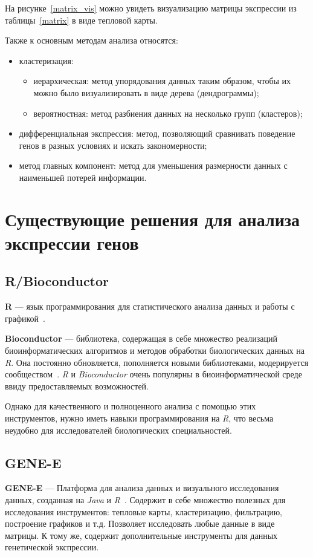 \documentclass[annotation,specification]{itmo-student-thesis}
\begin{document}
На рисунке~\ref{matrix_vis} можно увидеть визуализацию матрицы экспрессии из таблицы~\ref{matrix} в виде тепловой карты.

Также к основным методам анализа относятся:
\begin{itemize}
\item кластеризация:\begin{itemize}
\item иерархическая: метод упорядования данных таким образом, чтобы их можно было визуализировать в виде дерева (дендрограммы);
\item вероятностная: метод разбиения данных на несколько групп (кластеров);\end{itemize}
\item дифференциальная экспрессия: метод, позволяющий сравнивать поведение генов в разных условиях и искать закономерности;
\item метод главных компонент: метод для уменьшения размерности данных с наименьшей потерей информации. 
\end{itemize}

\section{Существующие решения для анализа экспрессии генов}
\subsection{R/Bioconductor}
\textbf{R} --- язык программирования для статистического анализа данных и работы с графикой~\cite{rproject}.

\textbf{Bioconductor} --- библиотека, содержащая в себе множество реализаций биоинформатических алгоритмов и методов обработки биологических данных на \emph{R}. Она постоянно обновляется, пополняется новыми библиотеками, модерируется сообществом~\cite{bioconductor}. \emph{R} и \emph{Bioconductor} очень популярны в биоинформатической среде ввиду предоставляемых возможностей.

Однако для качественного и полноценного анализа с помощью этих инструментов, нужно иметь навыки программирования на \emph{R}, что весьма неудобно для исследователей биологических специальностей.

\subsection{GENE-E}
\textbf{GENE-E} --- Платформа для анализа данных и визуального исследования данных, созданная на \emph{Java} и \emph{R}~\cite{genee}. Содержит в себе множество полезных для исследования инструментов: тепловые карты, кластеризацию, фильтрацию, построение графиков и т.д. Позволяет исследовать любые данные в виде матрицы. К тому же, содержит дополнительные инструменты для данных генетической экспрессии.
\end{document}
